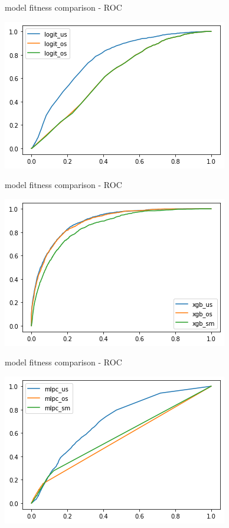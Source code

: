 \documentclass{beamer}
\begin{document}
\begin{frame}{model fitness comparison - ROC}

\begin{center}
\includegraphics[scale=0.55]{img/log_roc.png}
\end{center}
\end{frame}

\begin{frame}{model fitness comparison - ROC}

\begin{center}
\includegraphics[scale=0.55]{img/xgb_roc.png}
\end{center}
\end{frame}

\begin{frame}{model fitness comparison - ROC}

\begin{center}
\includegraphics[scale=0.55]{img/mlpc_roc.png}
\end{center}
\end{frame}
\end{document}
